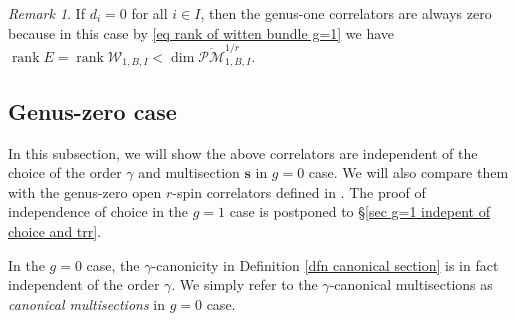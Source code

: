\documentclass[11pt]{amsart}
\theoremstyle{definition}
\theoremstyle{remark}
\newtheorem{rmk}[dummy]{Remark}
\newcommand{\oPMb}{{\overline{\mathcal{PM}}}}
\newcommand{\<}{\left<}
\renewcommand{\>}{\right>}
\numberwithin{equation}{section}
\DeclareMathOperator{\rk}{rank}
\begin{document}
\begin{rmk}\label{rmk vanish without psi g=1}
    If $d_i=0$ for all $i\in I$, then the genus-one correlators are always zero because in this case by \eqref{eq rank of witten bundle g=1} we have 
    $
    \rk E=\rk \mathcal W_{1,B,I}<\dim \oPMb_{1,B,I}^{1/r}.
    $
\end{rmk}



\subsection{Genus-zero case}
     In this subsection, we will show the above correlators are independent of the choice of the order $\gamma$ and multisection $\mathbf{s}$ in $g=0$ case. We will also compare them with the genus-zero open $r$-spin correlators defined in \cite{BCT2}. The proof of independence of choice in the $g=1$ case is postponed to \S\ref{sec g=1 indepent of choice and trr}.

     In the $g=0$ case, the $\gamma$-canonicity in Definition \ref{dfn canonical section} is in fact independent of the order $\gamma$. We simply refer to the $\gamma$-canonical multisections as \textit{canonical multisections} in $g=0$ case.
     
\end{document}
